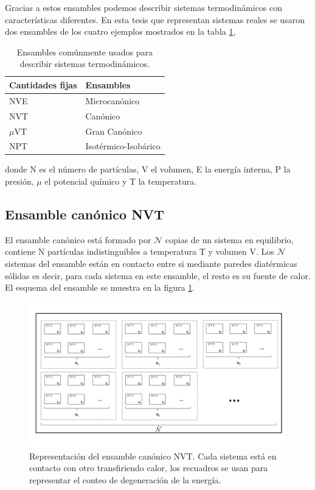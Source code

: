 Gracias a estos ensambles podemos describir sistemas termodinámicos con características diferentes. En esta tesis que representan sistemas reales se usaron dos ensambles de los cuatro ejemplos mostrados en la tabla \ref{tiposEnsamble},

\begin{table}[h!]
    \centering
    \begin{tabular}{ |p{3cm}||p{4cm}|  }
    \hline
    Cantidades fijas   & Ensambles \\
    \hline
    NVE   & Microcanónico \\
    NVT   & Canónico \\
    $\mu$VT& Gran Canónico \\
    NPT   & Isotérmico-Isobárico \\
    \hline
    \end{tabular}
    \caption{Ensambles comúnmente usados para describir sistemas termodinámicos.}
    \label{tiposEnsamble}
\end{table}

\noindent donde N es el número de partículas, V el volumen, E la energía interna, P la presión, $\mu$ el potencial químico y T la temperatura.

\subsection{Ensamble canónico NVT}

El ensamble canónico está formado por $\mathcal{N}$ copias de un sistema en equilibrio, contiene N partículas indistinguibles a temperatura T y volumen V. Los $\mathcal{N}$ sistemas del ensamble están en contacto entre si mediante paredes diatérmicas sólidas es decir, para cada sistema en este ensamble, el resto es su fuente de calor. El esquema del ensamble se muestra en la figura \ref{fig:CanonicEns}.\\

\begin{figure}[!h]
    \centering
    \includegraphics[width=1\textwidth,keepaspectratio=true]{StatMech/nvtensemble.png}
    \caption{Representación del ensamble canónico NVT. Cada sistema está en contacto con otro transfiriendo calor, los recuadros se usan para representar el conteo de degeneración de la energía.}
    \label{fig:CanonicEns}
\end{figure}

